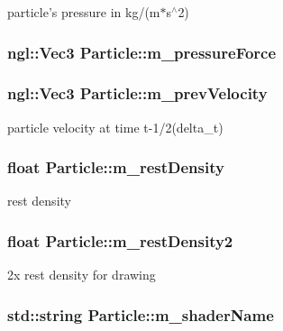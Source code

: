 particle's pressure in kg/(m$\ast$s$^\wedge$2) \hypertarget{classParticle_acf7bf74338658f448da9bf323b748bb4}{
\subsubsection[{m\_\-pressureForce}]{\setlength{\rightskip}{0pt plus 5cm}ngl::Vec3 {\bf Particle::m\_\-pressureForce}}}
\label{classParticle_acf7bf74338658f448da9bf323b748bb4}
\hypertarget{classParticle_ac1b3d740751addafa14c3533a155277a}{
\subsubsection[{m\_\-prevVelocity}]{\setlength{\rightskip}{0pt plus 5cm}ngl::Vec3 {\bf Particle::m\_\-prevVelocity}}}
\label{classParticle_ac1b3d740751addafa14c3533a155277a}


particle velocity at time t-\/1/2(delta\_\-t) \hypertarget{classParticle_a034612e9cd54961ae18980e9f36d2d93}{
\subsubsection[{m\_\-restDensity}]{\setlength{\rightskip}{0pt plus 5cm}float {\bf Particle::m\_\-restDensity}}}
\label{classParticle_a034612e9cd54961ae18980e9f36d2d93}


rest density \hypertarget{classParticle_aa307c489c26622823817ce2083ac37a1}{
\subsubsection[{m\_\-restDensity2}]{\setlength{\rightskip}{0pt plus 5cm}float {\bf Particle::m\_\-restDensity2}}}
\label{classParticle_aa307c489c26622823817ce2083ac37a1}


2x rest density for drawing \hypertarget{classParticle_a621671d7f023719e95f295408dd9f18d}{
\subsubsection[{m\_\-shaderName}]{\setlength{\rightskip}{0pt plus 5cm}std::string {\bf Particle::m\_\-shaderName}}}
\label{classParticle_a621671d7f023719e95f295408dd9f18d}


